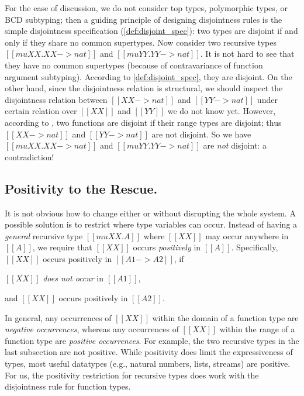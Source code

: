 For the ease of discussion, we do not consider top types, polymorphic types, or
BCD subtyping; then a guiding principle of designing disjointness rules is the
simple disjointness specification (\cref{def:disjoint_spec}): two types are
disjoint if and only if they share no common supertypes. Now consider two
recursive types $[[ mu XX . XX -> nat ]]$ and $[[ mu YY . YY -> nat]]$. It is
not hard to see that they have no common supertypes (because of contravariance of function argument subtyping). According to
\cref{def:disjoint_spec}, they are disjoint. On the other hand, since the
disjointness relation is structural, we should inspect the disjointness relation
between $[[ XX -> nat ]]$ and $[[YY -> nat ]]$ under certain relation over
$[[XX]]$ and $[[YY]]$ we do not know yet. However, according to , two functions are
disjoint if their range types are disjoint; thus $[[ XX -> nat ]]$ and $[[YY ->
nat ]]$ are not disjoint. So we have $[[ mu XX . XX -> nat]]$ and $[[ mu YY . YY -> nat]]$
are \textit{not} disjoint: a contradiction!


\subsection{Positivity to the Rescue.}

It is not obvious how to change either  or  without
disrupting the whole system. A possible solution is to restrict where type variables
can occur. Instead of
having a \textit{general} recursive type $[[mu XX . A]]$ where $[[XX]]$ may occur
anywhere in $[[A]]$, we require that $[[XX]]$ occurs \textit{positively} in
$[[A]]$. Specifically, $[[XX]]$ occurs positively in $[[A1 -> A2]]$, if
\begin{inparaenum}[(1)]
\item $[[XX]]$ \textit{does not occur} in $[[A1]]$,
\item and $[[XX]]$ occurs positively in $[[A2]]$.
\end{inparaenum}
In general, any occurrences of $[[XX]]$ within the domain of a function type are
\textit{negative occurrences}, whereas any occurrences of $[[XX]]$ within the
range of a function type are \textit{positive occurrences}. For example, the two
recursive types in the last subsection are not positive. While positivity does
limit the expressiveness of types, most useful datatypes (e.g., natural numbers,
lists, streams) are positive. For us, the positivity restriction for recursive types does work with the
disjointness rule for function types.

